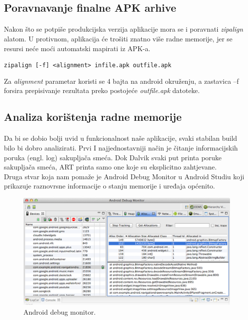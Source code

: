 \documentclass[times, utf8, zavrsni]{fer}
\begin{document}
\subsection{Poravnavanje finalne APK arhive}
\paragraph{}
Nakon što se potpiše produkcijska verzija aplikacije mora se i poravnati \textit{zipalign} alatom. U protivnom, aplikacija će trošiti znatno više radne memorije, jer se resursi neće moći automatski mapirati iz APK-a.

\begin{center}
\verb|zipalign [-f] <alignment> infile.apk outfile.apk|
\end{center}

Za \textit{alignment} parametar koristi se 4 bajta na android okruženju, a zastavica –f forsira prepisivanje rezultata preko postojeće \textit{outfile.apk} datoteke.

\subsection{Analiza korištenja radne memorije}
\paragraph{}
Da bi se dobio bolji uvid u funkcionalnost naše aplikacije, svaki stabilan build bilo bi dobro analizirati.
Prvi I najjednostavniji način je čitanje informacijskih poruka (engl. log) sakupljača smeća. Dok Dalvik svaki put printa poruke sakupljača smeća, ART printa samo one koje su eksplicitno zahtjevane.\\

Druga stvar koja nam pomaže je Android Debug Monitor u Android Studiu koji prikazuje raznovrsne informacije o stanju memorije i uređaja općenito.\\

\begin{figure}[ht!]
\centering
\includegraphics[width=140mm]{img/android-debug-monitor.png}
\caption{Android debug monitor.}
\label{overflow}
\end{figure}
\end{document}
